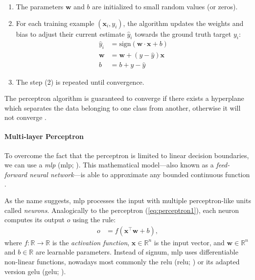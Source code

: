 \begin{enumerate}
  \item The parameters $\textbf{w}$ and $b$ are initialized to small random values (or zeros).
  \item For each training example $(\mathbf{x}_i, y_i)$, the algorithm updates the weights and bias to adjust their current estimate $\hat{y}_i$ towards the ground truth target $y_i$:
        \begin{align} \label{eq:perceptron1}
          \hat{y}_i  & = \text{sign}(\textbf{w} \cdot \mathbf{x} + b) \\
          \textbf{w} & = \textbf{w} + (y - \hat{y}) \textbf{x}        \\
          b          & = b + y - \hat{y}
        \end{align}
  \item The step (2) is repeated until convergence.
\end{enumerate}

The perceptron algorithm is guaranteed to converge if there exists a hyperplane which separates the data belonging to one class from another, otherwise it will not converge \cite{novikoff1962convergence}.

\paragraph{Multi-layer Perceptron} To overcome the fact that the perceptron is limited to linear decision boundaries, we can use a \emph{\acl{mlp}} (\acs{mlp}; \citealp[p.~164]{goodfellow2016deep}). This mathematical model---also known as a \emph{feed-forward neural network}---is able to approximate any bounded continuous function \cite{hornik1989multilayer}.

As the name suggests, \ac{mlp} processes the input with multiple perceptron-like units called \textit{neurons}. Analogically to the perceptron (\autoref{eq:perceptron1}), each neuron computes its output $o$ using the rule:
\begin{align}
  o & = f(\mathbf{x}^\top \mathbf{w}  + b),
\end{align}
where $f: \mathbb{R} \rightarrow \mathbb{R}$ is the \emph{activation function}, $\mathbf{x}\in \mathbb{R}^n$ is the input vector, and $\mathbf{w} \in \mathbb{R}^n$ and $b \in \mathbb{R}$ are learnable parameters. Instead of signum, \ac{mlp} uses differentiable non-linear functions, nowadays most commonly the \acl{relu} (\acs{relu}; \citealp{nair2010rectified}) or its adapted version \acl{gelu} (\acs{gelu}; \citealp{hendrycks2016gaussian}).

